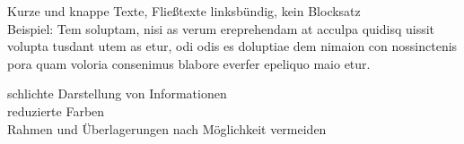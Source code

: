 \begin{frame}
 
Kurze und knappe Texte, Fließtexte linksbündig, kein Blocksatz \\[\baselineskip]

Beispiel:\newline
Tem soluptam, nisi as verum ereprehendam at acculpa quidisq uissit volupta
tusdant utem as etur, odi odis es doluptiae dem nimaion con nossinctenis pora
quam voloria consenimus blabore everfer epeliquo maio etur.

\end{frame}
\clearpage




\begin{frame}
    
schlichte Darstellung von Informationen \\[\baselineskip]

reduzierte Farben \\[\baselineskip]

Rahmen und Überlagerungen nach Möglichkeit vermeiden \\[\baselineskip]

    
\end{frame}
\clearpage



